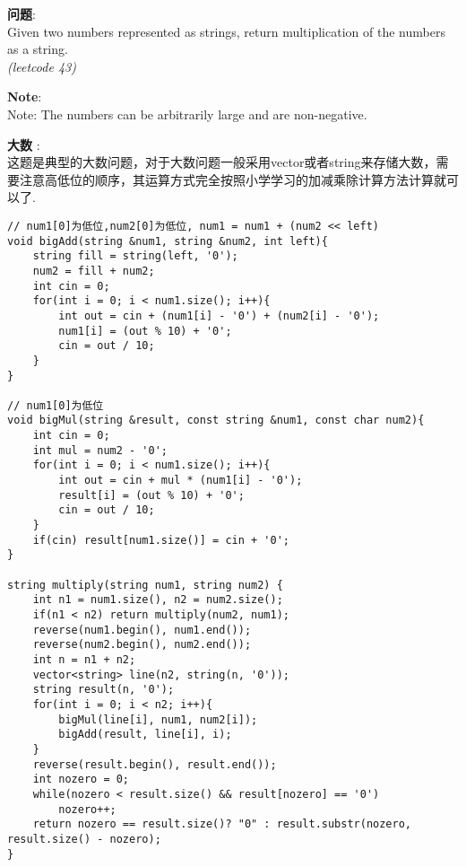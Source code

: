     
\begin{description}
    \item{\textbf{问题}}:\\
Given two numbers represented as strings, return multiplication of the numbers as a string.\\
\textit{(leetcode 43)}
    \item{\textbf{Note}}:\\
Note: The numbers can be arbitrarily large and are non-negative.
    \item{\textbf{大数}} : 
    \\这题是典型的大数问题，对于大数问题一般采用vector或者string来存储大数，需要注意高低位的顺序，其运算方式完全按照小学学习的加减乘除计算方法计算就可以了.
    \begin{lstlisting}
// num1[0]为低位,num2[0]为低位, num1 = num1 + (num2 << left)
void bigAdd(string &num1, string &num2, int left){
	string fill = string(left, '0');
	num2 = fill + num2;
	int cin = 0;
	for(int i = 0; i < num1.size(); i++){
		int out = cin + (num1[i] - '0') + (num2[i] - '0');
		num1[i] = (out % 10) + '0';
		cin = out / 10;
	}
}

// num1[0]为低位
void bigMul(string &result, const string &num1, const char num2){
	int cin = 0;
	int mul = num2 - '0';
	for(int i = 0; i < num1.size(); i++){
		int out = cin + mul * (num1[i] - '0');
		result[i] = (out % 10) + '0';
		cin = out / 10;
	}
	if(cin)	result[num1.size()] = cin + '0';
}

string multiply(string num1, string num2) {
	int n1 = num1.size(), n2 = num2.size();
	if(n1 < n2)	return multiply(num2, num1);
	reverse(num1.begin(), num1.end());
	reverse(num2.begin(), num2.end());
	int n = n1 + n2;
	vector<string> line(n2, string(n, '0'));
	string result(n, '0');
	for(int i = 0; i < n2; i++){
		bigMul(line[i], num1, num2[i]);
		bigAdd(result, line[i], i);
	}
	reverse(result.begin(), result.end());
	int nozero = 0;
	while(nozero < result.size() && result[nozero] == '0')
		nozero++;
	return nozero == result.size()? "0" : result.substr(nozero, result.size() - nozero);
}
    \end{lstlisting}
\end{description}
